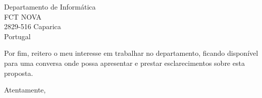 \documentclass[11pt]{letter} %
\begin{document}
\begin{letter}{Departamento de Informática\\
FCT NOVA\\
2829-516 Caparica\\
Portugal}

 
Por fim, reitero o meu interesse em trabalhar no departamento, ficando
    disponível para uma conversa onde possa apresentar e prestar esclarecimentos
    sobre esta proposta.

\closing{Atentamente,}




\end{letter}
\end{document}
